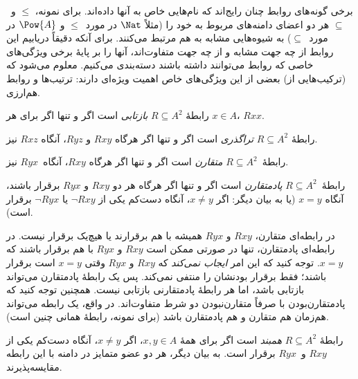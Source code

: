 \documentclass[../../../include/open-logic-section]{subfiles}
\begin{document}

\begin{intro}
برخی گونه‌های روابط چنان رایج‌اند که نام‌هایی خاص به آنها داده‌اند.
برای نمونه، $\le$ و~$\subseteq$ هر دو اعضای دامنه‌های مربوط به خود را
(مثلاً $\Nat$ در مورد~$\le$ و $\Pow{A}$ در مورد~$\subseteq$) به
شیوه‌هایی مشابه به هم مرتبط می‌کنند. برای آنکه دقیقاً دریابیم این روابط
از چه جهت مشابه و از چه جهت متفاوت‌اند، آنها را بر پایهٔ برخی ویژگی‌های
خاصی که روابط می‌توانند داشته باشند دسته‌بندی می‌کنیم. معلوم می‌شود که
(ترکیب‌هایی از) بعضی از این ویژگی‌های خاص اهمیت ویژه‌ای دارند: ترتیب‌ها
و روابط هم‌ارزی.
\end{intro}

\begin{defn}
رابطهٔ $R \subseteq A^2$ \emph{بازتابی} است اگر و تنها اگر برای هر $x \in
A$، $Rxx$.
\end{defn}

\begin{defn}[تراگذری]
رابطهٔ $R \subseteq A^2$ \emph{تراگذری} است اگر و تنها اگر هرگاه $Rxy$
و $Ryz$، آنگاه $Rxz$ نیز.
\end{defn}

\begin{defn}[تقارن]
رابطهٔ~$R \subseteq A^2$ \emph{متقارن} است اگر و تنها اگر هرگاه
$Rxy$، آنگاه~$Ryx$ نیز.
\end{defn}

\begin{defn}[پادتقارنی]
رابطهٔ~$R \subseteq A^2$ \emph{پادمتقارن} است اگر و تنها اگر هرگاه هر دو
$Rxy$ و $Ryx$ برقرار باشند، آنگاه $x=y$ (یا به بیان دیگر: اگر $x\neq y$،
آنگاه دست‌کم یکی از $\lnot Rxy$ یا $\lnot Ryx$ برقرار است).
\end{defn}

\begin{explain}
در رابطه‌ای متقارن، $Rxy$ و $Ryx$ همیشه با هم برقرارند یا هیچ‌یک برقرار
نیست. در رابطه‌ای پادمتقارن، تنها در صورتی ممکن است $Rxy$ و $Ryx$ با هم
برقرار باشند که $x = y$. توجه کنید که این امر \emph{ایجاب نمی‌کند} که
$Rxy$ و $Ryx$ وقتی $x = y$ است برقرار باشند؛ فقط برقرار بودنشان را منتفی
نمی‌کند. پس یک رابطهٔ پادمتقارن می‌تواند بازتابی باشد، اما هر رابطهٔ
پادمتقارنی بازتابی نیست. همچنین توجه کنید که پادمتقارن‌بودن با صرفاً
متقارن‌نبودن دو شرط متفاوت‌اند. در واقع، یک رابطه می‌تواند هم‌زمان هم
متقارن و هم پادمتقارن باشد (برای نمونه، رابطهٔ همانی چنین است).
\end{explain}

\begin{defn}[همبندی]
رابطهٔ $R \subseteq A^2$ \emph{همبند} است اگر برای همهٔ $x,y\in
A$، اگر $x \neq y$، آنگاه دست‌کم یکی از $Rxy$ و~$Ryx$ برقرار است.
به بیان دیگر، هر دو عضو متمایز در دامنه با این رابطه مقایسه‌پذیرند.
\end{defn}
\end{document}
